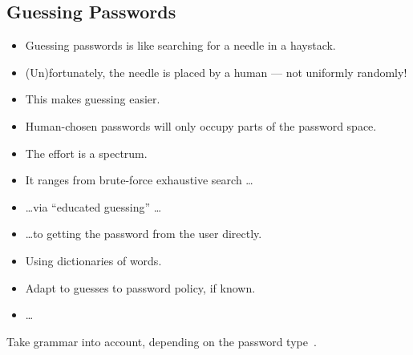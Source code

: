 \subsection{Guessing Passwords}

\begin{frame}
  \begin{itemize}
    \item Guessing passwords is like searching for a needle in a haystack.

      \pause{}

    \item (Un)fortunately, the needle is placed by a human --- not uniformly 
      randomly!
    \item This makes guessing easier.
    \item Human-chosen passwords will only occupy parts of the password space.
  \end{itemize}
\end{frame}

\begin{frame}
  \begin{itemize}
    \item The effort is a spectrum.

    \item It ranges from brute-force exhaustive search \dots

      \pause{}

    \item \dots via \enquote{educated guessing} \dots

      \pause{}

    \item \dots to getting the password from the user directly.
  \end{itemize}
\end{frame}

\begin{frame}
  \begin{example}
    \begin{itemize}
      \item Using dictionaries of words.
      \item Adapt to guesses to password policy, if known.
      \item \dots
    \end{itemize}
  \end{example}

  \pause{}

  \begin{example}
    Take grammar into account, depending on the password 
    type~\cite{Bonneau2012ghs,Bonneau2012lpo}.
  \end{example}
\end{frame}

